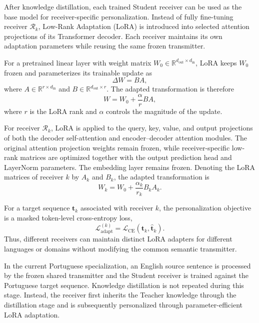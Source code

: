 \documentclass[conference]{IEEEtran}
\begin{document}
After knowledge distillation, each trained Student receiver can be used as the base model for receiver-specific personalization. Instead of fully fine-tuning receiver $\mathcal{R}_k$, Low-Rank Adaptation (LoRA) \cite{hu2022lora} is introduced into selected attention projections of its Transformer decoder. Each receiver maintains its own adaptation parameters while reusing the same frozen transmitter.

For a pretrained linear layer with weight matrix
$W_0\in\mathbb{R}^{d_{\mathrm{out}}\times d_{\mathrm{in}}}$,
LoRA keeps $W_0$ frozen and parameterizes its trainable update as
\begin{equation}
    \Delta W = BA,
\end{equation}
where
$A\in\mathbb{R}^{r\times d_{\mathrm{in}}}$ and
$B\in\mathbb{R}^{d_{\mathrm{out}}\times r}$.
The adapted transformation is therefore
\begin{equation}
    W =
    W_0 + \frac{\alpha}{r}BA,
\end{equation}
where $r$ is the LoRA rank and $\alpha$ controls the magnitude of the update.

For receiver $\mathcal{R}_k$, LoRA is applied to the query, key, value, and output projections of both the decoder self-attention and encoder--decoder attention modules. The original attention projection weights remain frozen, while receiver-specific low-rank matrices are optimized together with the output prediction head and LayerNorm parameters. The embedding layer remains frozen. Denoting the LoRA matrices of receiver $k$ by $A_k$ and $B_k$, the adapted transformation is
\begin{equation}
    W_k
    =
    W_0
    +
    \frac{\alpha_k}{r_k}
    B_k A_k.
\end{equation}

For a target sequence $\mathbf{t}_k$ associated with receiver $k$, the personalization objective is a masked token-level cross-entropy loss,
\begin{equation}
    \mathcal{L}_{\mathrm{adapt}}^{(k)}
    =
    \mathcal{L}_{\mathrm{CE}}
    \left(
        \mathbf{t}_k,
        \hat{\mathbf{t}}_k
    \right).
\end{equation}
Thus, different receivers can maintain distinct LoRA adapters for different languages or domains without modifying the common semantic transmitter.

In the current Portuguese specialization, an English source sentence is processed by the frozen shared transmitter and the Student receiver is trained against the Portuguese target sequence. Knowledge distillation is not repeated during this stage. Instead, the receiver first inherits the Teacher knowledge through the distillation stage and is subsequently personalized through parameter-efficient LoRA adaptation.
\end{document}
